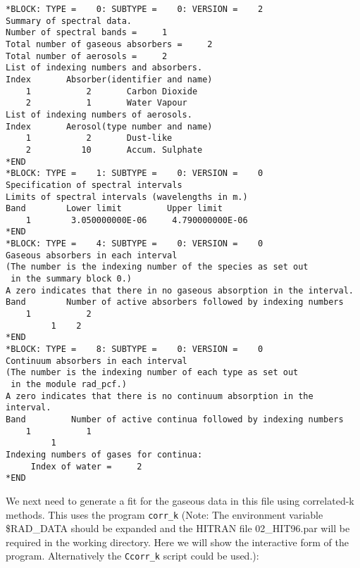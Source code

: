 {\small
\begin{verbatim}
*BLOCK: TYPE =    0: SUBTYPE =    0: VERSION =    2
Summary of spectral data.
Number of spectral bands =     1
Total number of gaseous absorbers =     2
Total number of aerosols =     2
List of indexing numbers and absorbers.
Index       Absorber(identifier and name)
    1           2       Carbon Dioxide      
    2           1       Water Vapour        
List of indexing numbers of aerosols.
Index       Aerosol(type number and name)
    1           2       Dust-like           
    2          10       Accum. Sulphate     
*END
*BLOCK: TYPE =    1: SUBTYPE =    0: VERSION =    0
Specification of spectral intervals
Limits of spectral intervals (wavelengths in m.)
Band        Lower limit         Upper limit
    1        3.050000000E-06     4.790000000E-06
*END
*BLOCK: TYPE =    4: SUBTYPE =    0: VERSION =    0
Gaseous absorbers in each interval
(The number is the indexing number of the species as set out
 in the summary block 0.)
A zero indicates that there in no gaseous absorption in the interval.
Band        Number of active absorbers followed by indexing numbers
    1           2
         1    2
*END
*BLOCK: TYPE =    8: SUBTYPE =    0: VERSION =    0
Continuum absorbers in each interval
(The number is the indexing number of each type as set out
 in the module rad_pcf.)
A zero indicates that there is no continuum absorption in the interval.
Band         Number of active continua followed by indexing numbers
    1           1
         1
Indexing numbers of gases for continua:
     Index of water =     2
*END
\end{verbatim}
}

We next need to generate a fit for the gaseous data in this file using 
correlated-k methods. This uses the program {\tt corr\_k} (Note: The
environment variable \$RAD\_DATA should be expanded and the HITRAN file
02\_HIT96.par will be required in the working directory. Here we will
show the interactive form of the program. Alternatively the {\tt Ccorr\_k}
script could be used.):

